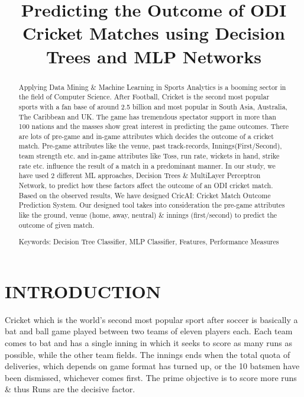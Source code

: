 \documentclass[a4paper, 10pt, conference]{IEEEtran}
\title{Predicting the Outcome of ODI Cricket Matches using Decision Trees and MLP Networks}
\author{
\IEEEauthorblockN{Rajeev Kumar\IEEEauthorrefmark{1},Jalaz Kumar\IEEEauthorrefmark{2}}
\IEEEauthorblockA{
\IEEEauthorrefmark{1}Assistant Professor,\IEEEauthorrefmark{2}Student\\
Department of Computer Science and Engineering\\
National Institute of Technology Hamirpur, India\\
Email: \IEEEauthorrefmark{1}rajeev@nith.ac.in,\IEEEauthorrefmark{2}jalazkumar1208@gmail.com}}
\begin{document}
\maketitle
\thispagestyle{empty}
\pagestyle{empty}


\begin{abstract}

Applying Data Mining \& Machine Learning in Sports Analytics is a booming sector in the field of Computer Science. After Football, Cricket is the second most popular sports with a fan base of around 2.5 billion and most popular in South Asia, Australia, The Caribbean and UK. The game has tremendous spectator support in more than 100 nations and the masses show great interest in predicting the game outcomes. There are lots of pre-game and in-game attributes which decides the outcome of a cricket match. Pre-game attributes like the venue, past track-records, Innings(First/Second), team strength etc. and in-game attributes like Toss, run rate, wickets in hand, strike rate etc. influence the result of a match in a predominant manner. In our study, we have used 2 different ML approaches, Decision Trees \& MultiLayer Perceptron Network, to predict how these factors affect the outcome of an ODI cricket match. Based on the observed results, We have designed CricAI: Cricket Match Outcome Prediction System. Our designed tool takes into consideration the pre-game attributes like the ground, venue (home, away, neutral) \& innings (first/second) to predict the outcome of given match.


Keywords: Decision Tree Classifier, MLP Classifier, Features, Performance Measures

\end{abstract}


\section{INTRODUCTION}

Cricket which is the world's second most popular sport after soccer is basically a bat and ball game played between two teams of eleven players each. Each team comes to bat and has a single inning in which it seeks to score as many runs as possible, while the other team fields. The innings ends when the total quota of deliveries, which depends on game format has turned up, or the 10 batsmen have been dismissed, whichever comes first. The prime objective is to score more runs \& thus Runs are the decisive factor.
\end{document}
